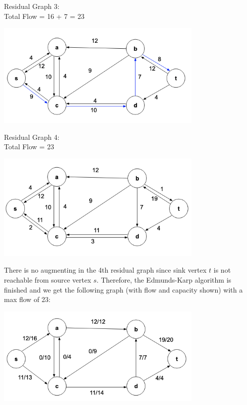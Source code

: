 \documentclass{article}
\begin{document}
Residual Graph 3:\\
Total Flow = 16 + 7 = 23 
\begin{center}
    \includegraphics[width=0.75\textwidth]{4-4.png}
\end{center}

Residual Graph 4:\\
Total Flow = 23
\begin{center}
    \includegraphics[width=0.75\textwidth]{4-5.png}
\end{center}

There is no augmenting in the 4th residual graph since sink vertex $t$ is not reachable from source vertex $s$. Therefore, the Edmunds-Karp algorithm is finished and we get the following graph (with flow and capacity shown) with a max flow of 23:

\begin{center}
    \includegraphics[width=0.75\textwidth]{4-6.png}
\end{center}
\end{document}
